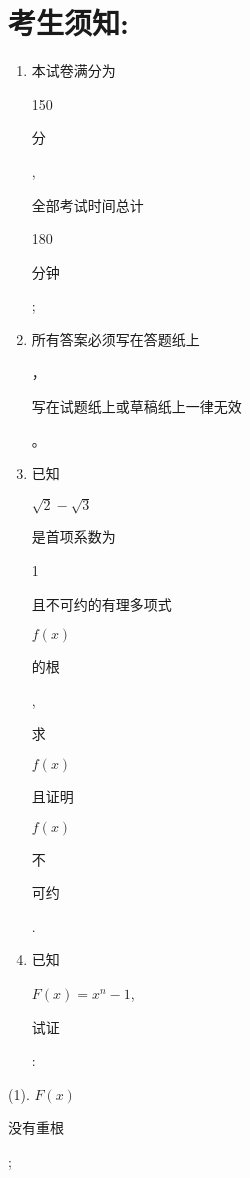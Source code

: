 \documentclass[10pt]{article}
\begin{document}
\section{考生须知:}
\begin{enumerate}
  \item \begin{CJK}{UTF8}{mj}本试卷满分为\end{CJK} 150 \begin{CJK}{UTF8}{mj}分\end{CJK}, \begin{CJK}{UTF8}{mj}全部考试时间总计\end{CJK} 180 \begin{CJK}{UTF8}{mj}分钟\end{CJK};

  \item \begin{CJK}{UTF8}{mj}所有答案必须写在答题纸上\end{CJK}，\begin{CJK}{UTF8}{mj}写在试题纸上或草稿纸上一律无效\end{CJK}。

  \item \begin{CJK}{UTF8}{mj}已知\end{CJK} $\sqrt{2}-\sqrt{3}$ \begin{CJK}{UTF8}{mj}是首项系数为\end{CJK} 1 \begin{CJK}{UTF8}{mj}且不可约的有理多项式\end{CJK} $f(x)$ \begin{CJK}{UTF8}{mj}的根\end{CJK}, \begin{CJK}{UTF8}{mj}求\end{CJK} $f(x)$ \begin{CJK}{UTF8}{mj}且证明\end{CJK} $f(x)$ \begin{CJK}{UTF8}{mj}不\end{CJK} \begin{CJK}{UTF8}{mj}可约\end{CJK}.

  \item \begin{CJK}{UTF8}{mj}已知\end{CJK} $F(x)=x^{n}-1$, \begin{CJK}{UTF8}{mj}试证\end{CJK}:

\end{enumerate}
(1). $F(x)$ \begin{CJK}{UTF8}{mj}没有重根\end{CJK};
\end{document}
